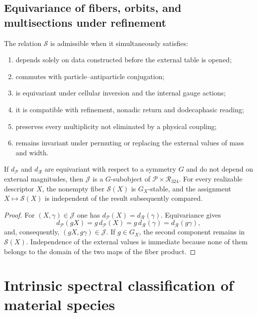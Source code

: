 \subsection{Equivariance of fibers, orbits, and multisections under refinement}

\begin{definition}
The relation \(\mathscr S\) is admissible when it simultaneously satisfies:
\begin{enumerate}
\item depends solely on data constructed before the external table is opened;
\item commutes with particle--antiparticle conjugation;
\item is equivariant under cellular inversion and the internal
      gauge actions;
\item it is compatible with refinement, nonadic return and dodecaphasic
      reading;
\item preserves every multiplicity not eliminated by a physical coupling;
\item remains invariant under permuting or replacing the external values of
      mass and width.
\end{enumerate}
\end{definition}

\begin{theorem}
If \(d_{\mathcal P}\) and \(d_{\mathcal R}\) are equivariant with respect to a symmetry \(G\) and do not depend on external magnitudes, then \(\mathcal J\) is a \(G\)-subobject of \(\mathcal P\times\mathcal R_{324}\). For every realizable descriptor \(X\), the nonempty fiber \(\mathscr S(X)\) is \(G_X\)-stable, and the assignment \(X\mapsto\mathscr S(X)\) is independent of the result subsequently compared.
\end{theorem}

\begin{proof}
For \((X,\gamma)\in\mathcal J\) one has
\(d_{\mathcal P}(X)=d_{\mathcal R}(\gamma)\). Equivariance gives
\[
 d_{\mathcal P}(gX)=g\,d_{\mathcal P}(X)
 =g\,d_{\mathcal R}(\gamma)=d_{\mathcal R}(g\gamma),
\]
and, consequently, \((gX,g\gamma)\in\mathcal J\). If \(g\in G_X\), the
second component remains in \(\mathscr S(X)\). Independence of the
external values is immediate because none of them belongs to the domain
of the two maps of the fiber product.
\end{proof}

\section{Intrinsic spectral classification of material species}

